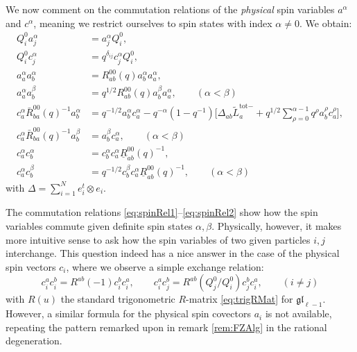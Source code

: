We now comment on the commutation relations of the \emph{physical} spin variables $a^\alpha$ and $c^\alpha$, meaning we restrict ourselves to spin states with index $\alpha \neq 0$. We obtain:
\begin{align}
    Q_i^0 a_j^\alpha &= a_j^\alpha Q_i^0, \label{eq:spinRel1} \\[6pt]
    Q_i^0 c_j^\alpha &= q^{\delta_{ij}} c_j^\alpha Q_i^0, \\[6pt]
    a_a^\alpha a_b^\alpha &= R_{ab}^{00}(q) a_b^\alpha a_a^\alpha, \\[6pt]
    a_a^\alpha a_b^\beta &= q^{1/2} R_{ab}^{00}(q) a_b^\beta a_a^\alpha, \qquad (\alpha < \beta) \\[-2pt]
    c_a^\alpha \bar R_{ba}^{00}(q)^{-1} a_b^\alpha &= q^{-1/2} a_b^\alpha c_a^\alpha - q^{-\alpha} (1-q^{-1}) \bigg[ \Delta_{ab} \tilde L_a^{\text{tot}-} + q^{1/2} \sum_{\rho=0}^{\alpha-1} q^\rho a_b^\rho c_a^\rho \bigg], \\[-3pt]
    c_a^\alpha \bar R_{ba}^{00}(q)^{-1} a_b^\beta &= a_b^\beta c_a^\alpha, \qquad (\alpha < \beta) \\[6pt]
    c_a^\alpha c_b^\alpha &= c_b^\alpha c_a^\alpha \underline R_{ab}^{00}(q)^{-1}, \\[6pt]
    c_a^\alpha c_b^\beta &= q^{-1/2} c_b^\beta c_a^\alpha \underline R_{ab}^{00}(q)^{-1}, \qquad (\alpha < \beta) \label{eq:spinRel2}
\end{align}
with $\Delta = \sum_{i=1}^N e_i^t \otimes e_i$.

The commutation relations \eqref{eq:spinRel1}--\eqref{eq:spinRel2} show how the spin variables commute given definite spin states $\alpha,\beta$. Physically, however, it makes more intuitive sense to ask how the spin variables of two given particles $i,j$ interchange. This question indeed has a nice answer in the case of the physical spin vectors $c_i$, where we observe a simple exchange relation:
\begin{equation}\label{eq:spinExchange}
    c_i^a c_i^b = R^{ab}(-1) c_i^b c_i^a, \qquad c_i^a c_j^b = R^{ab}(Q_j^0/Q_i^0) c_j^b c_i^a, \qquad (i \neq j)
\end{equation}
with $R(u)$ the standard trigonometric $R$-matrix \eqref{eq:trigRMat} for $\mathfrak{gl}_{\ell-1}$. However, a similar formula for the physical spin covectors $a_i$ is not available, repeating the pattern remarked upon in remark \ref{rem:FZAlg} in the rational degeneration.

